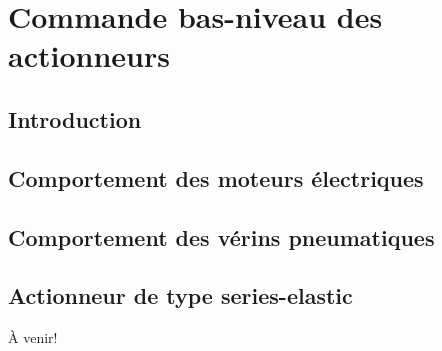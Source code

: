 \chapter{Commande bas-niveau des actionneurs}
\label{sec:actuatorcontrol}


\section{Introduction}


\section{Comportement des moteurs électriques}

\section{Comportement des vérins pneumatiques}

\section{Actionneur de type series-elastic}

À venir!
